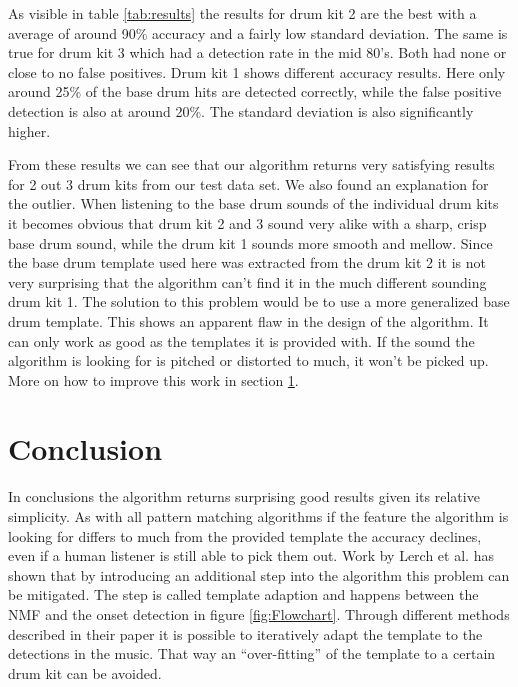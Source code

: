 \documentclass{article}
\begin{document}
As visible in table \ref{tab:results} the results for drum kit 2 are the best with a average of around 90\% accuracy and a fairly low standard deviation.
The same is true for drum kit 3 which had a detection rate in the mid 80's.
Both had none or close to no false positives.
Drum kit 1 shows different accuracy results.
Here only around 25\% of the base drum hits are detected correctly, while the false positive detection is also at around 20\%.
The standard deviation is also significantly higher.

From these results we can see that our algorithm returns very satisfying results for 2 out 3 drum kits from our test data set.
We also found an explanation for the outlier.
When listening to the base drum sounds of the individual drum kits it becomes obvious that drum kit 2 and 3 sound very alike with a sharp, crisp base drum sound, while the drum kit 1 sounds more smooth and mellow.
Since the base drum template used here was extracted from the drum kit 2 it is not very surprising that the algorithm can't find it in the much different sounding drum kit 1.
The solution to this problem would be to use a more generalized base drum template.
This shows an apparent flaw in the design of the algorithm.
It can only work as good as the templates it is provided with.
If the sound the algorithm is looking for is pitched or distorted to much, it won't be picked up.
More on how to improve this work in section \ref{sec:conclusion}.






\section{Conclusion}
\label{sec:conclusion}

In conclusions the algorithm returns surprising good results given its relative simplicity.
As with all pattern matching algorithms if the feature the algorithm is looking for differs to much from the provided template the accuracy declines, even if a human listener is still able to pick them out.
Work by Lerch et al. \cite{lerch2015} has shown that by introducing an additional step into the algorithm this problem can be mitigated.
The step is called template adaption and happens between the NMF and the onset detection in figure \ref{fig:Flowchart}.
Through different methods described in their paper it is possible to iteratively adapt the template to the detections in the music.
That way an ``over-fitting'' of the template to a certain drum kit can be avoided.
\end{document}
